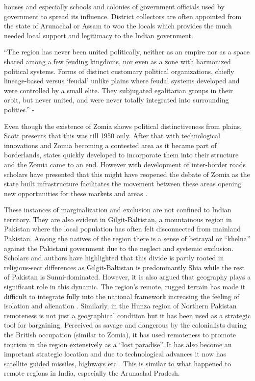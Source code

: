 houses and especially schools and colonies of government officials used by government to spread its influence. District collectors are often appointed from the state of Arunachal or Assam to woo the locals which provides the much needed local support and legitimacy to the Indian government.  

\vspace{0.3cm}

 \enquote{The region has never been united politically, neither as an empire nor as a space shared among a few feuding kingdoms, nor even as a zone with harmonized political systems. Forms of distinct customary political organizations, chiefly lineage-based versus \enquote{feudal} unlike plains where feudal systems developed and were controlled by a small elite. They subjugated egalitarian groups in their orbit, but never united, and were never totally integrated into surrounding polities.} - \citep{michaud2017s}

\vspace{0.3cm}

 Even though the existence of Zomia shows political distinctiveness from plains, Scott presents that this was till 1950 only. After that with technological innovations and Zomia becoming a contested area as it became part of borderlands, states quickly developed to incorporate them into their structure and the Zomia came to an end. However with development of inter-border roads scholars have presented that this might have reopened the debate of Zomia as the state built infrastructure facilitates the movement between these areas opening new opportunities for these markets and areas \citep{murton2013himalayan}. 

 \vspace{0.3cm}

 These instances of marginalization and exclusion are not confined to Indian territory. They are also evident in Gilgit-Baltistan, a mountainous region in Pakistan where the local population has often felt disconnected from mainland Pakistan. Among the natives of the region there is a sense of betrayal or \enquote{khelna} against the Pakistani government due to the neglect and systemic exclusion. Scholars and authors have highlighted that this divide is partly rooted in religious-sect differences as Gilgit-Baltistan is predominantly Shia while the rest of Pakistan is  Sunni-dominated. However, it is also argued that geography plays a significant role in this dynamic. The region's remote, rugged terrain has  made it difficult to integrate fully into the national framework  increasing the feeling of isolation and alienation \citep{ali2019delusional}. Similarly, in the Hunza region of Northern Pakistan  remoteness is not just a geographical condition but it has been used as a strategic tool for bargaining. Perceived as savage and dangerous by the colonialists during the British occupation (similar to Zomia), it has used remoteness to promote tourism in the region extensively as a \enquote{lost paradise}. It has also become an important strategic location and due to technological  advances it now has satellite guided missiles, highways etc \citep{hussain2015remoteness}. This is similar to what happened to remote regions in India, especially the Arunachal Pradesh.

